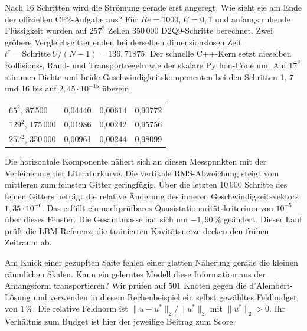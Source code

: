 Nach 16 Schritten wird die Strömung gerade erst angeregt. Wie sieht sie am Ende der offiziellen CP2-Aufgabe aus? Für \(Re=1000\), \(U=0{,}1\) und anfangs ruhende Flüssigkeit wurden auf \(257^2\) Zellen 350\,000 D2Q9-Schritte berechnet. Zwei gröbere Vergleichsgitter enden bei derselben dimensionslosen Zeit \(t^*=\mathrm{Schritte}\,U/(N-1)=136{,}71875\). Der schnelle C++-Kern setzt dieselben Kollisions-, Rand- und Transportregeln wie der skalare Python-Code um. Auf \(17^2\) stimmen Dichte und beide Geschwindigkeitskomponenten bei den Schritten 1, 7 und 16 bis auf \(2{,}45\cdot10^{-15}\) überein.
{\tblstart\begin{tabularx}{\linewidth}{@{}Yrrr@{}}\toprule
{}&&&\\\midrule
\(65^2\), 87\,500&0,04440&0,00614&0,90772\\
\(129^2\), 175\,000&0,01986&0,00242&0,95756\\
\(257^2\), 350\,000&0,00961&0,00244&0,98099\\\bottomrule\end{tabularx}\par}
Die horizontale Komponente nähert sich an diesen Messpunkten mit der Verfeinerung der Literaturkurve. Die vertikale RMS-Abweichung steigt vom mittleren zum feinsten Gitter geringfügig. Über die letzten 10\,000 Schritte des feinen Gitters beträgt die relative Änderung des inneren Geschwindigkeitsvektors \(1{,}35\cdot10^{-6}\). Das erfüllt ein nachprüfbares Quasistationaritätskriterium von \(10^{-5}\) über dieses Fenster. Die Gesamtmasse hat sich um \(-1{,}90\,\%\) geändert. Dieser Lauf prüft die LBM-Referenz; die trainierten Kavitätsnetze decken den frühen Zeitraum ab.

Am Knick einer gezupften Saite fehlen einer glatten Näherung gerade die kleinen räumlichen Skalen. Kann ein gelerntes Modell diese Information aus der Anfangsform transportieren? Wir prüfen auf 501 Knoten gegen die d’Alembert-Lösung und verwenden in diesem Rechenbeispiel ein selbst gewähltes Feldbudget von \(1\,\%\). Die relative Feldnorm ist \(\|u-u^*\|_2/\|u^*\|_2\) mit \(\|u^*\|_2>0\). Ihr Verhältnis zum Budget ist hier der jeweilige Beitrag zum Score.

